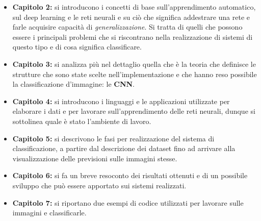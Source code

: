 \begin{itemize}
  \item \textbf{Capitolo 2:} si introducono i concetti di base sull'apprendimento automatico, 
  sul deep learning e le reti neurali e su ciò che significa addestrare una rete e farle acquisire capacità 
  di \emph{generalizzazione}. Si tratta di quelli che possono essere i principali problemi che si riscontrano
  nella realizzazione di sistemi di questo tipo e di cosa significa classificare.
  \item \textbf{Capitolo 3:} si analizza più nel dettaglio quella che è la teoria che definisce le strutture che sono state scelte
   nell'implementazione e che 
  hanno reso possibile 
  la classificazione d'immagine: le \textbf{CNN}.
  \item \textbf{Capitolo 4:} si introducono i linguaggi e le applicazioni utilizzate per elaborare i dati e
  per lavorare sull'apprendimento delle reti neurali, dunque si sottolinea quale è stato l'ambiente di lavoro.
  \item \textbf{Capitolo 5:} si descrivono le fasi per realizzazione del sistema di classificazione, a partire dal
 descrizione dei dataset fino ad arrivare alla visualizzazione delle previsioni sulle immagini stesse.
 \item \textbf{Capitolo 6:} si fa un breve resoconto dei risultati ottenuti e di un possibile sviluppo che può
 essere apportato sui sistemi realizzati. 
 \item \textbf{Capitolo 7:} si riportano due esempi di codice utilizzati per lavorare sulle immagini e classificarle.
\end{itemize}

